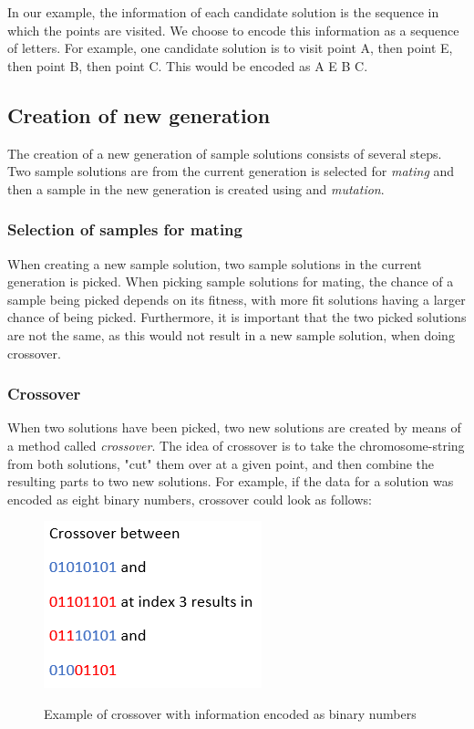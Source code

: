 In our example, the information of each candidate solution is the sequence in which the points are visited. We choose to encode this information as a sequence of letters. For example, one candidate solution is to visit point A, then point E, then point B, then point C. This would be encoded as
A E B C.

\subsection{Creation of new generation}
The creation of a new generation of sample solutions consists of several steps. Two sample solutions are from the current generation is selected for \textit{mating} and then a sample in the new generation is created using  and \textit{mutation}.

\subsubsection{Selection of samples for mating}
When creating a new sample solution, two sample solutions in the current generation is picked. When picking sample solutions for mating, the chance of a sample being picked depends on its fitness, with more fit solutions having a larger chance of being picked. Furthermore, it is important that the two picked solutions are not the same, as this would not result in a new sample solution, when doing crossover.

\subsubsection{Crossover}
When two solutions have been picked, two new solutions are created by means of a method called \textit{crossover}. The idea of crossover is to take the chromosome-string from both solutions, "cut" them over at a given point, and then combine the resulting parts to two new solutions. For example, if the data for a solution was encoded as eight binary numbers, crossover could look as follows:

\begin{figure}[h]
	\centering
	{\includegraphics[scale=0.5]{Images/crossover_binary.PNG}}\\[0.5cm]
	\caption{Example of crossover with information encoded as binary numbers}
	\label{fig:crossover_binary}
\end{figure}



